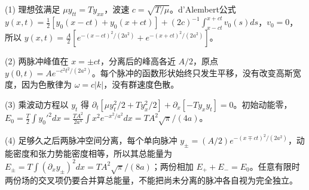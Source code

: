 (1) 理想弦满足 \(\mu y_{tt}=Ty_{xx}\)，波速 \(c=\sqrt{T/\mu}\)。d'Alembert公式 \(y(x,t)=\frac12[y_0(x-ct)+y_0(x+ct)]+(2c)^{-1}\int_{x-ct}^{x+ct}v_0(s)ds\)，\(v_0=0\)，所以 \(y(x,t)=\frac A2[e^{-(x-ct)^2/(2a^2)}+e^{-(x+ct)^2/(2a^2)}]\)。

(2) 两脉冲峰值在 \(x=\pm ct\)，分离后的峰高各近 \(A/2\)，原点 \(y(0,t)=A e^{-c^2t^2/(2a^2)}\)。每个脉冲的函数形状始终只发生平移，没有改变高斯宽度，因为色散律为 \(\omega=c|k|\)，没有群速度色散。

(3) 乘波动方程以 \(y_t\) 得 \(\partial_t[\mu y_t^2/2+Ty_x^2/2]+\partial_x[-Ty_xy_t]=0\)。初始动能零，\(E_0=\frac T2\int y_0'^2dx=\frac{TA^2}{2a^4}\int x^2e^{-x^2/a^2}dx=TA^2\sqrt\pi/(4a)\)。

(4) 足够久之后两脉冲空间分离，每个单向脉冲 \(y_\pm=(A/2)e^{-(x\mp ct)^2/(2a^2)}\)，动能密度和张力势能密度相等，所以其总能量为 \(E_\pm=T\int (\partial_xy_\pm)^2dx=TA^2\sqrt\pi/(8a)\)；两份相加 \(E_++E_-=E_0\)。任意有限时两份场的交叉项仍要合并算总能量，不能把尚未分离的脉冲各自视为完全独立。
